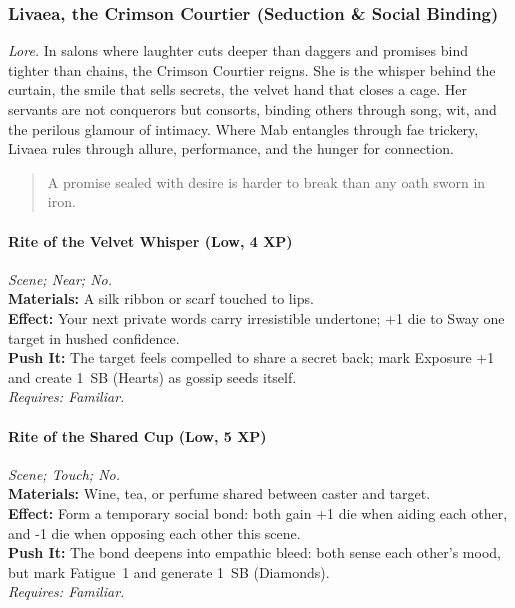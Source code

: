 
\subsubsection{Livaea, the Crimson Courtier (Seduction \& Social Binding)}
\textit{Lore.} In salons where laughter cuts deeper than daggers and promises bind tighter than chains, the Crimson Courtier reigns. She is the whisper behind the curtain, the smile that sells secrets, the velvet hand that closes a cage. Her servants are not conquerors but consorts, binding others through song, wit, and the perilous glamour of intimacy. Where Mab entangles through fae trickery, Livaea rules through allure, performance, and the hunger for connection.

\begin{quote}
A promise sealed with desire is harder to break than any oath sworn in iron.
\end{quote}

\paragraph*{Rite of the Velvet Whisper (Low, 4 XP)} \emph{Scene; Near; No.}\\
\textbf{Materials:} A silk ribbon or scarf touched to lips.\\
\textbf{Effect:} Your next private words carry irresistible undertone; +1 die to Sway one target in hushed confidence.\\
\textbf{Push It:} The target feels compelled to share a secret back; mark Exposure +1 and create 1~SB (Hearts) as gossip seeds itself.\\
\emph{Requires: Familiar.}

\paragraph*{Rite of the Shared Cup (Low, 5 XP)} \emph{Scene; Touch; No.}\\
\textbf{Materials:} Wine, tea, or perfume shared between caster and target.\\
\textbf{Effect:} Form a temporary social bond: both gain +1 die when aiding each other, and -1 die when opposing each other this scene.\\
\textbf{Push It:} The bond deepens into empathic bleed: both sense each other’s mood, but mark Fatigue~1 and generate 1~SB (Diamonds).\\
\emph{Requires: Familiar.}

